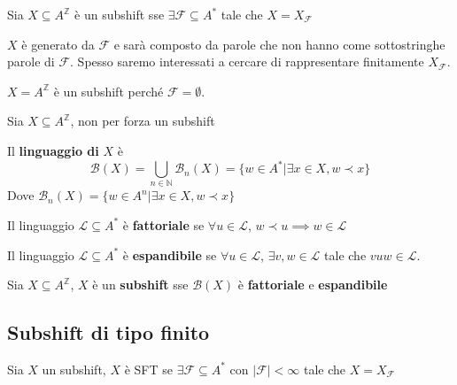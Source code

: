 \begin{definizione} 
    Sia $X\subseteq A^\mathbb{Z}$ è un subshift sse $\exists \mathcal{F}\subseteq A^\ast$
    tale che $X= X_\mathcal{F}$
\end{definizione}

$X$ è generato da $\mathcal{F}$ e sarà composto da parole che non hanno come 
sottostringhe parole di $\mathcal{F}$. Spesso saremo interessati a cercare 
di rappresentare finitamente $X_\mathcal{F}$.

\begin{esempio}
    $X =  A^\mathbb{Z}$ è un subshift perché $\mathcal{F} = \emptyset$.
\end{esempio}

Sia $X\subseteq A^\mathbb{Z}$, non per forza un subshift
\begin{definizione} 
    Il \textbf{linguaggio di} $X$ è
    $$\mathcal{B}(X) = \bigcup_{n\in \mathbb{N}} \mathcal{B}_n(X)= \{w\in A^\ast| \exists x\in X, w\prec x\}$$
    Dove $\mathcal{B}_n(X) = \{w\in A^n| \exists x\in X, w\prec x\}$
\end{definizione}

\begin{definizione} 
    Il linguaggio $\mathcal{L}\subseteq A^\ast$ è \textbf{fattoriale} se $\forall
    u\in \mathcal{L}$, $w\prec u\implies w\in \mathcal{L}$

\end{definizione}


\begin{definizione} 
    Il linguaggio $\mathcal{L}\subseteq A^\ast$ è \textbf{espandibile} se $\forall
    u\in \mathcal{L}$, $\exists v,w\in \mathcal{L}$ tale che $vuw\in \mathcal{L}$.
\end{definizione}

\begin{teorema}
    Sia $X\subseteq A^\mathbb{Z}$, $X$ è un \textbf{subshift} sse $\mathcal{B}(X)$ è 
    \textbf{fattoriale} e \textbf{espandibile}
\end{teorema}

\subsection{Subshift di tipo finito}
\begin{definizione} 
    Sia $X$ un subshift, $X$ è SFT se $\exists \mathcal{F}\subseteq A^\ast$ con
    $|\mathcal{F}|<\infty$ tale che $X= X_\mathcal{F}$
\end{definizione}

